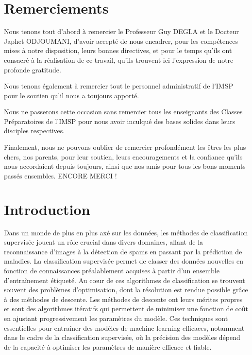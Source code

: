 \documentclass[12pt,a4paper,openay]{book}
\numberwithin{equation}{chapter}
\begin{document}
	\chapter{Remerciements}
	\vspace*{1cm}
	{\large Nous tenons tout d'abord \`a remercier le Professeur Guy DEGLA et le Docteur Japhet ODJOUMANI, d'avoir accepté de nous encadrer, pour les comp\'etences mises à notre disposition, leurs bonnes directives, et pour le temps qu'ils ont consacr\'e \`a la r\'ealisation de ce travail, qu'ils trouvent ici l'expression de notre profonde gratitude.
	
	Nous tenons \'egalement \`a remercier tout le personnel administratif de l'IMSP pour le soutien qu'il nous a toujours apporté.
	
	Nous ne passerons cette occasion sans remercier tous les enseignants des Classes Préparatoires de l'IMSP pour nous avoir inculqué des bases solides dans leurs disciples respectives.
	
	Finalement, nous ne pouvons oublier de remercier profond\'ement les \^etres les 
	plus chers, nos parents, pour leur soutien, leurs encouragements et la 
	confiance qu'ils nous accordaient depuis toujours, ainsi que nos  amis pour 
	tous les bons moments pass\'es ensembles. ENCORE MERCI !}
	
	\newpage
	
	\chapter{Introduction}	
	
	Dans un monde de plus en plus ax\'e sur les donn\'ees, les m\'ethodes de classification supervis\'ee jouent un rôle crucial dans divers domaines, allant de la reconnaissance d'images \`a la d\'etection de spams en passant par la pr\'ediction de maladies. La classification supervis\'ee permet de classer des donn\'ees nouvelles en fonction de connaissances pr\'ealablement acquises \`a partir d'un ensemble d'entraînement \'etiquet\'e. Au c\oe{}ur de ces algorithmes de classification se trouvent souvent des probl\`emes d'optimisation, dont la r\'esolution est rendue possible grâce \`a des m\'ethodes de descente. Les m\'ethodes de descente ont leurs mérites propres et sont des algorithmes it\'eratifs qui permettent de minimiser une fonction de coût en ajustant progressivement les param\`etres du mod\`ele. Ces techniques sont essentielles pour entra\^iner des mod\`eles de machine learning efficaces, notamment dans le cadre de la classification supervis\'ee, o\`u la pr\'ecision des mod\`eles d\'epend de la capacit\'e \`a optimiser les param\`etres de mani\`ere efficace et fiable.
	
\end{document}
